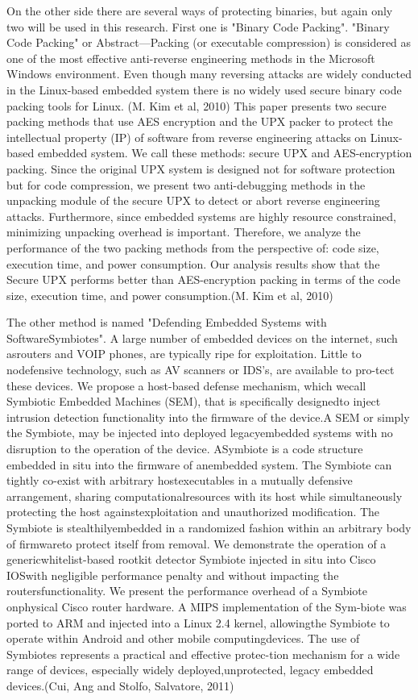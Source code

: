 \documentclass[]{report}
\begin{document}
On the other side there are several ways of protecting binaries, but again only two will be used in this research. First one is "Binary Code Packing".
"Binary Code Packing" or Abstract—Packing (or executable compression) is considered as
one of the most effective anti-reverse engineering methods in
the Microsoft Windows environment. Even though many
reversing attacks are widely conducted in the Linux-based
embedded system there is no widely used secure binary code
packing tools for Linux. (M. Kim et al, 2010)
This paper presents two secure
packing methods that use AES encryption and the UPX packer
to protect the intellectual property (IP) of software from
reverse engineering attacks on Linux-based embedded system.
We call these methods: secure UPX and AES-encryption
packing. Since the original UPX system is designed not for
software protection but for code compression, we present two
anti-debugging methods in the unpacking module of the secure
UPX to detect or abort reverse engineering attacks.
Furthermore, since embedded systems are highly resource
constrained, minimizing unpacking overhead is important.
Therefore, we analyze the performance of the two packing
methods from the perspective of: code size, execution
time, and power consumption. Our analysis results show
that the Secure UPX performs better than AES-encryption
packing in terms of the code size, execution time, and power
consumption.(M. Kim et al, 2010)
						
The other method is named "Defending Embedded Systems with SoftwareSymbiotes".
A large number of embedded devices on the internet, such asrouters and VOIP phones, are typically ripe for exploitation. Little to nodefensive technology, such as AV scanners or IDS’s, are available to pro-tect these devices. We propose a host-based defense mechanism, which wecall Symbiotic Embedded Machines (SEM), that is speciﬁcally designedto inject intrusion detection functionality into the ﬁrmware of the device.A SEM or simply the Symbiote, may be injected into deployed legacyembedded systems with no disruption to the operation of the device. ASymbiote is a code structure embedded in situ into the ﬁrmware of anembedded system. The Symbiote can tightly co-exist with arbitrary hostexecutables in a mutually defensive arrangement, sharing computationalresources with its host while simultaneously protecting the host againstexploitation and unauthorized modiﬁcation. The Symbiote is stealthilyembedded in a randomized fashion within an arbitrary body of ﬁrmwareto protect itself from removal. We demonstrate the operation of a genericwhitelist-based rootkit detector Symbiote injected in situ into Cisco IOSwith negligible performance penalty and without impacting the routersfunctionality. We present the performance overhead of a Symbiote onphysical Cisco router hardware. A MIPS implementation of the Sym-biote was ported to ARM and injected into a Linux 2.4 kernel, allowingthe Symbiote to operate within Android and other mobile computingdevices. The use of Symbiotes represents a practical and eﬀective protec-tion mechanism for a wide range of devices, especially widely deployed,unprotected, legacy embedded devices.(Cui, Ang and Stolfo, Salvatore, 2011)
\end{document}
